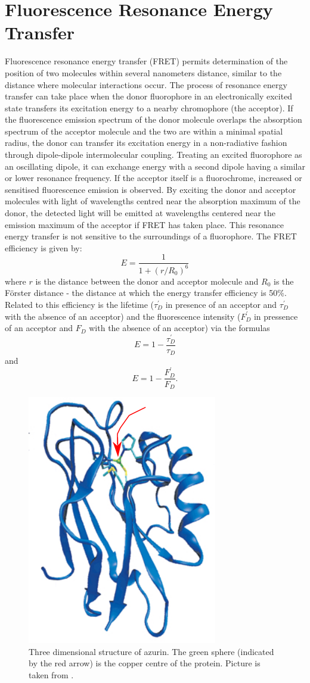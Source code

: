 \documentclass[twoside,single]{lion-msc}
\begin{document}
\section{Fluorescence Resonance Energy Transfer}
Fluorescence resonance energy transfer (FRET) permits determination of the position of two molecules within several nanometers distance, similar to the distance where molecular interactions occur. The process of resonance energy transfer can take place when the donor fluorophore in an electronically excited state transfers its excitation energy to a nearby chromophore (the acceptor). If the fluorescence emission spectrum of the donor molecule overlaps the absorption spectrum of the acceptor molecule and the two are within a minimal spatial radius, the donor can transfer its excitation energy in a non-radiative fashion through dipole-dipole intermolecular coupling. Treating an excited fluorophore as an oscillating dipole, it can exchange energy with a second dipole having a similar or lower resonance frequency. If the acceptor itself is a fluorochrome, increased or sensitised fluorescence emission is observed. By exciting the donor and acceptor molecules with light of wavelengths centred near the absorption maximum of the donor, the detected light will be emitted at wavelengths centered near the emission maximum of the acceptor if FRET has taken place. This resonance energy transfer is not sensitive to the surroundings of a fluorophore. The FRET efficiency is given by:
\begin{equation}
E = \frac{1}{1 + (r/R_{0})^{6}}
\end{equation}
where $r$ is the distance between the donor and acceptor molecule and $R_{0}$ is the F\"orster distance - the distance at which the energy transfer efficiency is 50\%. Related to this efficiency is the lifetime ($\tau_{D}^{'}$ in presence of an acceptor and $\tau_{D}^{'}$ with the absence of an acceptor) and the fluorescence intensity ($F_{D}^{'}$ in pressence of an acceptor and $F_{D}$ with the absence of an acceptor) via the formulas
\begin{equation}
E = 1 - \frac{\tau_{D}^{'}}{\tau_{D}}
\end{equation}
and
\begin{equation}
E = 1 - \frac{F_{D}^{'}}{F_{D}}.
\end{equation}



\begin{figure}[ht!]
\centering
\includegraphics[width=0.25 \textwidth]{azurin1_test}
\caption{Three dimensional structure of azurin. The green sphere (indicated by the red arrow) is the copper centre of the protein. Picture is taken from \cite{BORMAN2010}.} 
\label{azurin}
\end{figure}
\end{document}
